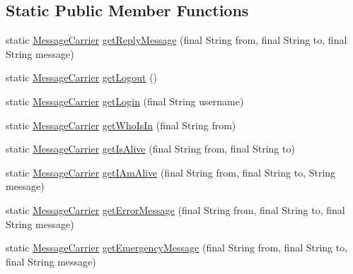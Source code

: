 \subsection*{Static Public Member Functions}
\begin{DoxyCompactItemize}
\item 
static \hyperlink{classgov_1_1fnal_1_1ppd_1_1dd_1_1chat_1_1MessageCarrier}{Message\-Carrier} \hyperlink{classgov_1_1fnal_1_1ppd_1_1dd_1_1chat_1_1MessageCarrier_a0b3d0cac46ac4c642045a98e78a5d541}{get\-Reply\-Message} (final String from, final String to, final String message)
\item 
static \hyperlink{classgov_1_1fnal_1_1ppd_1_1dd_1_1chat_1_1MessageCarrier}{Message\-Carrier} \hyperlink{classgov_1_1fnal_1_1ppd_1_1dd_1_1chat_1_1MessageCarrier_a58cfc7579e97952714838a1a69488a3e}{get\-Logout} ()
\item 
static \hyperlink{classgov_1_1fnal_1_1ppd_1_1dd_1_1chat_1_1MessageCarrier}{Message\-Carrier} \hyperlink{classgov_1_1fnal_1_1ppd_1_1dd_1_1chat_1_1MessageCarrier_aaa7970bd6d632f5e2e56884fd2e5d528}{get\-Login} (final String username)
\item 
static \hyperlink{classgov_1_1fnal_1_1ppd_1_1dd_1_1chat_1_1MessageCarrier}{Message\-Carrier} \hyperlink{classgov_1_1fnal_1_1ppd_1_1dd_1_1chat_1_1MessageCarrier_ab7af24fd90518abf7a0facac05d64b3e}{get\-Who\-Is\-In} (final String from)
\item 
static \hyperlink{classgov_1_1fnal_1_1ppd_1_1dd_1_1chat_1_1MessageCarrier}{Message\-Carrier} \hyperlink{classgov_1_1fnal_1_1ppd_1_1dd_1_1chat_1_1MessageCarrier_a04ca970aa1904aed4189a72a2109e76d}{get\-Is\-Alive} (final String from, final String to)
\item 
static \hyperlink{classgov_1_1fnal_1_1ppd_1_1dd_1_1chat_1_1MessageCarrier}{Message\-Carrier} \hyperlink{classgov_1_1fnal_1_1ppd_1_1dd_1_1chat_1_1MessageCarrier_ad3ae47a06a161739da95be215dd7781a}{get\-I\-Am\-Alive} (final String from, final String to, String message)
\item 
static \hyperlink{classgov_1_1fnal_1_1ppd_1_1dd_1_1chat_1_1MessageCarrier}{Message\-Carrier} \hyperlink{classgov_1_1fnal_1_1ppd_1_1dd_1_1chat_1_1MessageCarrier_a7b99547dc0124d5ae6d197f31c55effd}{get\-Error\-Message} (final String from, final String to, final String message)
\item 
static \hyperlink{classgov_1_1fnal_1_1ppd_1_1dd_1_1chat_1_1MessageCarrier}{Message\-Carrier} \hyperlink{classgov_1_1fnal_1_1ppd_1_1dd_1_1chat_1_1MessageCarrier_a41ee3b86b92786ed41ad66f9a139ab8c}{get\-Emergency\-Message} (final String from, final String to, final String message)

\end{DoxyCompactItemize}
